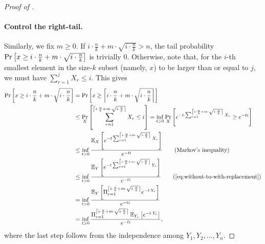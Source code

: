 \begin{proof}[Proof of ]
\paragraph{Control the right-tail.} Similarly, we fix $m \ge 0$. If $i\cdot\frac{n}{k} + m\cdot\sqrt{i \cdot\frac{n}{k}} > n$, the tail probability $\Pr_{}\left[x \ge i\cdot\frac{n}{k} + m\cdot\sqrt{i \cdot\frac{n}{k}}\right]$ is trivially $0$. Otherwise, note that, for the $i$-th smallest element in the size-$k$ subset (namely, $x$) to be larger than or equal to $j$, we must have $\sum_{r = 1}^j X_r \le i$. This gives
\begin{align*}
    \pr{}{x \ge i\cdot\frac{n}{k} + m\cdot\sqrt{i \cdot\frac{n}{k}}}
&=  \pr{}{x \ge \left\lceil i\cdot \frac{n}{k} + m\cdot \sqrt{i\cdot \frac{n}{k}}\right\rceil}\\
&\le\pr{X}{\sum_{r=1}^{\left\lceil i\cdot \frac{n}{k} + m\cdot \sqrt{i\cdot \frac{n}{k}}\right \rceil } X_r \le i}
=   \inf_{t > 0}\pr{X}{e^{-t\cdot \sum_{r=1}^{\left\lceil i\cdot \frac{n}{k} + m\cdot \sqrt{i\cdot \frac{n}{k}}\right \rceil }X_r} \ge e^{-ti}}\\
&\le\inf_{t>0}\frac{\Ex{X}{e^{-t\sum_{r=1}^{\left\lceil i\cdot \frac{n}{k} + m\cdot \sqrt{i\cdot \frac{n}{k}} \right \rceil}X_r}}}{e^{-ti}} \tag{Markov's inequality}\\
&\le\inf_{t>0}\frac{\Ex{Y}{e^{-t\sum_{r=1}^{\left\lceil i\cdot \frac{n}{k} + m\cdot \sqrt{i\cdot \frac{n}{k}}\right \rceil }Y_r}}}{e^{-ti}} \tag{\Cref{eq:without-to-with-replacement}}\\
&=  \inf_{t>0}\frac{\Ex{Y}{\Pi_{r=1}^{\left\lceil i\cdot \frac{n}{k} + m\cdot \sqrt{i\cdot \frac{n}{k}}\right \rceil } e^{-t \cdot Y_r}}}{e^{-ti}}\\
&=  \inf_{t>0}\frac{\Pi_{r=1}^{\left\lceil i\cdot \frac{n}{k} + m\cdot \sqrt{i\cdot \frac{n}{k}}\right \rceil }\Ex{Y_r}{e^{-t \cdot Y_r}}}{e^{-ti}},
\end{align*}
where the last step follows from the independence among $Y_1, Y_2, \ldots, Y_n$.


\end{proof}
